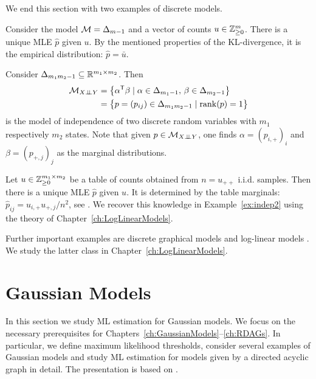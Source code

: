 We end this section with two examples of discrete models.

\begin{example} \label{ex:FullDiscreteModel}
	Consider the model $\mathcal{M} = \Delta_{m-1}$ and a vector of counts $u \in \mathbb Z_{\geq 0}^m$. There is a unique MLE $\hat{p}$ given $u$. By the mentioned properties of the KL-divergence, it is the empirical distribution: $\hat{p} = \bar{u}$.
	\hfill\exSymbol
\end{example}

\begin{example} \label{ex:IndependenceModel}
	Consider $\Delta_{m_1 m_2 - 1} \subseteq \mathbb R^{m_1 \times m_2}$. Then
		\begin{equation*}
			\begin{split}
				\mathcal{M}_{X {\perp\!\!\!\perp} Y} &= \big\{ \alpha^{\mathsf{T}} \beta \mid \alpha \in \Delta_{m_1 - 1}, \, \beta\in \Delta_{m_2 - 1} \big\} \\
				&= \big\{ p=(p_{ij}) \in \Delta_{m_1m_2 - 1} \mid \operatorname{rank}(p) = 1  \big\}
			\end{split}
		\end{equation*}
	is the model of independence of two discrete random variables with $m_1$ respectively $m_2$ states. Note that given $p \in \mathcal{M}_{X {\perp\!\!\!\perp} Y}$, one finds $\alpha = (p_{i,+})_i$ and $\beta = (p_{+,j})_j$ as the marginal distributions. 
	
	Let $u \in \mathbb Z_{\geq 0}^{m_1 \times m_2}$ be a table of counts obtained from $n = u_{++}$ i.i.d. samples. Then there is a unique MLE $\hat{p}$ given $u$. It is determined by the table marginals: $\hat{p}_{ij} = u_{i,+} u_{+,j} / n^2$, see \cite[Proposition~5.3.8]{SullivantBook}. We recover this knowledge in Example~\ref{ex:indep2} using the theory of Chapter~\ref{ch:LogLinearModels}.
	\hfill\exSymbol
\end{example}

Further important examples are discrete graphical models \cite{LauritzenBook, SullivantBook} and log-linear models \cite{LecturesAlgebraicStatistics, SullivantBook}. We study the latter class in Chapter~\ref{ch:LogLinearModels}.



\section{Gaussian Models}\label{sec:GaussianModelsMLestimation}

In this section we study ML estimation for Gaussian models. We focus on the necessary prerequisites for Chapters~\ref{ch:GaussianModels}--\ref{ch:RDAGs}. In particular, we define maximum likelihood thresholds, consider several examples of Gaussian models and study ML estimation for models given by a directed acyclic graph in detail. The presentation is based on \cite{SiagaPaper, RDAG}.

